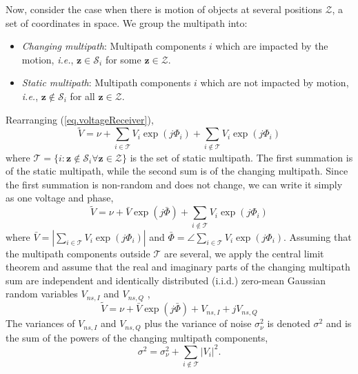 \documentclass[journal]{IEEEtran}
\newcommand{\ie}{{\it i.e.}}
\newcommand{\mbz}[0]{\mathbf{z}}
\begin{document}
Now, consider the case when there is motion of objects at several positions $\mathcal{Z}$, a set of coordinates in space.  We group the multipath into:
\begin{itemize}
\item \textit{Changing multipath}: Multipath components $i$ which are impacted by the motion, \ie, $\mbz \in \mathcal{S}_i$ for some $\mbz \in \mathcal{Z}$.
\item \textit{Static multipath}: Multipath components $i$ which are not impacted by motion, \ie, $\mbz \notin \mathcal{S}_i$ for all $\mbz \in \mathcal{Z}$.
\end{itemize}
Rearranging (\ref{eq.voltageReceiver}), 
\begin{equation}\label{eq.voltageReceiverGrouped}
\tilde{V} = \nu + \sum_{i \in \mathcal{T}} V_i \exp\left( j\Phi_i\right) + \sum_{i\notin \mathcal{T}} V_i \exp\left( j\Phi_i\right) 
\end{equation}
where $\mathcal{T} = \{i:\mbz \notin \mathcal{S}_i \forall \mbz \in \mathcal{Z}\}$ is the set of static multipath.  The first summation is of the static multipath, while the second sum is of the changing multipath. Since the first summation is non-random and does not change, we can write it simply as one voltage and phase,
\begin{equation}\label{eq.voltageReceiverGrouped2}
\tilde{V} = \nu + \bar{V} \exp\left( j\bar{\Phi} \right) + \sum_{i\notin \mathcal{T}} V_i \exp\left( j\Phi_i\right) 
\end{equation}
where $\bar{V} = \left|\sum_{i \in \mathcal{T}} V_i \exp\left( j\Phi_i\right) \right|$ and $\bar{\Phi} = \angle \sum_{i \in \mathcal{T}} V_i \exp\left( j\Phi_i\right)$.  Assuming that the multipath components outside $\mathcal{T}$ are several, we apply the central limit theorem and assume that the real and imaginary parts of the changing multipath sum are independent and identically distributed (i.i.d.) zero-mean Gaussian random variables $V_{ns,I}$ and $V_{ns,Q}$ \cite{durgin02},
\begin{equation}\label{eq.voltageReceiverRandom}
\tilde{V} = \nu + \bar{V} \exp\left( j\bar{\Phi} \right) + V_{ns,I} + j V_{ns,Q}
\end{equation}
The variances of $V_{ns,I}$ and $V_{ns,Q}$ plus the variance of noise $\sigma^2_{\nu}$ is denoted $\sigma^2$ and is the sum of the powers of the changing multipath components,
\begin{equation}\label{eq.NS_power}
\sigma^2 = \sigma^2_{\nu} + \sum_{i\notin \mathcal{T}} |V_i |^2.
\end{equation}
\end{document}
